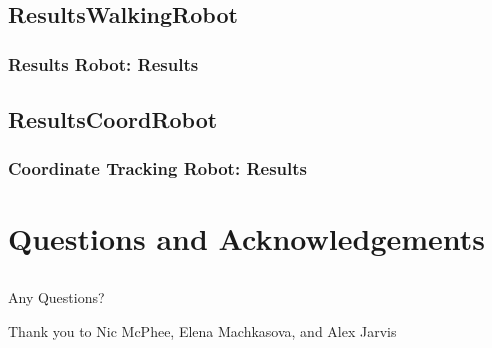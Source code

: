 \documentclass{beamer}
\begin{document}
\subsection{ResultsWalkingRobot}
\begin{frame}
  \frametitle{Results Robot: Results}
\end{frame}

\subsection{ResultsCoordRobot}
\begin{frame}
  \frametitle{Coordinate Tracking Robot: Results}
\end{frame}

\section{Questions and Acknowledgements}
\subsection{}
\begin{frame}
  \frametitle{}
  Any Questions?

Thank you to Nic McPhee, Elena Machkasova, and Alex Jarvis
\end{frame}
\end{document}
